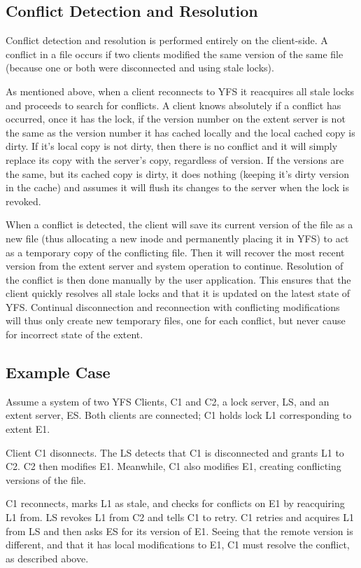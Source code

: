 \documentclass[11pt]{article}
\begin{document}
\subsection{Conflict Detection and Resolution}
Conflict detection and resolution is performed entirely on the client-side. A conflict in a file occurs if two clients modified the same version of the same file (because one or both were disconnected and using stale locks). 

As mentioned above, when a client reconnects to YFS it reacquires all stale locks and proceeds to search for conflicts. A client knows absolutely if a conflict has occurred, once it has the lock, if the version number on the extent server is not the same as the version number it has cached locally and the local cached copy is dirty. If it's local copy is not dirty, then there is no conflict and it will simply replace its copy with the server's copy, regardless of version. If the versions are the same, but its cached copy is dirty, it does nothing (keeping it's dirty version in the cache) and assumes it will flush its changes to the server when the lock is revoked.

When a conflict is detected, the client will save its current version of the file as a new file (thus allocating a new inode and permanently placing it in YFS) to act as a temporary copy of the conflicting file. Then it will recover the most recent version from the extent server and system operation to continue. Resolution of the conflict is then done manually by the user application. This ensures that the client quickly resolves all stale locks and that it is updated on the latest state of YFS. Continual disconnection and reconnection with conflicting modifications will thus only create new temporary files, one for each conflict, but never cause for incorrect state of the extent.

\subsection{Example Case}
Assume a system of two YFS Clients, C1 and C2, a lock server, LS, and an extent server, ES. Both clients are connected; C1 holds lock L1 corresponding to extent E1.

Client C1 disonnects. The LS detects that C1 is disconnected and grants L1 to C2. C2 then modifies E1. Meanwhile, C1 also modifies E1, creating conflicting versions of the file.

C1 reconnects, marks L1 as stale, and checks for conflicts on E1 by reacquiring L1 from. LS revokes L1 from C2 and tells C1 to retry. C1 retries and acquires L1 from LS and then asks ES for its version of E1. Seeing that the remote version is different, and that it has local modifications to E1, C1 must resolve the conflict, as described above.
\end{document}
